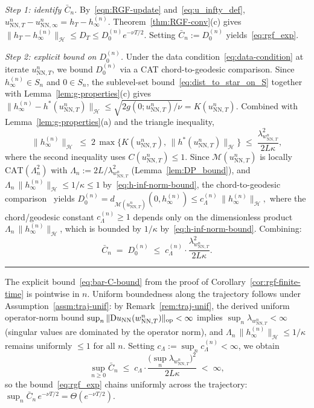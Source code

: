 \documentclass[twoside,11pt]{article}
\newcommand{\BlackBoxProof}{\rule{1.5ex}{1.5ex}}
\renewenvironment{proof}{\par\noindent{\bf Proof\ }}{\hfill\BlackBoxProof\par\medskip}
\newcommand{\D}{\mathrm{D}}
\newcommand{\NN}{\mathrm{NN}}
\newcommand{\calH}{\mathcal{H}}
\newcommand{\calM}{\mathcal{M}}
\begin{document}
\begin{proof}
\emph{Step 1: identify $\bar C_n$.}
By~\eqref{eqn:RGF-update} and~\eqref{eq:u_infty_def}, $u^n_{\NN,T}-u^n_{\NN,\infty}=h_T-h_\infty^{(n)}$. Theorem~\ref{thm:RGF-conv}(c) gives $\|h_T-h_\infty^{(n)}\|_\calH\le D_T\le D_0^{(n)} e^{-\nu T/2}$. Setting $\bar C_n:=D_0^{(n)}$ yields~\eqref{eq:rgf_exp}.

\emph{Step 2: explicit bound on $D_0^{(n)}$.}
Under the data condition~\eqref{eq:data-condition} at iterate $u^n_{\NN,T}$, we bound $D_0^{(n)}$ via a CAT chord-to-geodesic comparison. Since $h_\infty^{(n)}\in S_n$ and $0\in S_n$, the sublevel-set bound~\eqref{eq:dist_to_star_on_S} together with Lemma~\ref{lem:g-properties}(c) gives
\(
\|h_\infty^{(n)}-h^*(u^n_{\NN,T})\|_\calH \le \sqrt{2g(0;u^n_{\NN,T})/\nu} = K(u^n_{\NN,T}).
\)
Combined with Lemma~\ref{lem:g-properties}(a) and the triangle inequality,
\begin{equation}\label{eq:h-inf-norm-bound}
\|h_\infty^{(n)}\|_\calH \;\le\; 2\,\max\bigl\{K(u^n_{\NN,T}),\,\|h^*(u^n_{\NN,T})\|_\calH\bigr\} \;\le\; \frac{\lambda_{w^n_{\NN,T}}^{2}}{2L\kappa},
\end{equation}
where the second inequality uses $C(u^n_{\NN,T})\le 1$. Since $\calM(u^n_{\NN,T})$ is locally $\mathrm{CAT}(\Lambda_n^{2})$ with $\Lambda_n:=2L/\lambda_{w^n_{\NN,T}}^{2}$ (Lemma~\ref{lem:DP_bound}), and $\Lambda_n\,\|h_\infty^{(n)}\|_\calH\le 1/\kappa\le 1$ by~\eqref{eq:h-inf-norm-bound}, the chord-to-geodesic comparison~\citep[Part~II, Prop.~1.4 and Thm.~4.1]{bridson2013metric} yields
\(
D_0^{(n)} = d_{\calM(u^n_{\NN,T})}(0,h_\infty^{(n)}) \le c_\Lambda^{(n)}\,\|h_\infty^{(n)}\|_\calH,
\)
where the chord/geodesic constant $c_\Lambda^{(n)}\ge 1$ depends only on the dimensionless product $\Lambda_n\,\|h_\infty^{(n)}\|_\calH$, which is bounded by $1/\kappa$ by~\eqref{eq:h-inf-norm-bound}. Combining:
\begin{equation}\label{eq:bar-C-bound}
\bar C_n \;=\; D_0^{(n)} \;\le\; c_\Lambda^{(n)}\cdot\frac{\lambda_{w^n_{\NN,T}}^{2}}{2L\kappa}.
\end{equation}
\end{proof}

\begin{remark}\label{rem:Cbar-bound}
The explicit bound~\eqref{eq:bar-C-bound} from the proof of Corollary~\ref{cor:rgf-finite-time} is pointwise in $n$. Uniform boundedness along the trajectory follows under Assumption~\ref{assm:traj-unif}: by Remark~\ref{rem:traj-unif}, the derived uniform operator-norm bound $\sup_n\|\D u_\NN(w^n_{\NN,T})\|_{\rm op}<\infty$ implies $\sup_n\lambda_{w^n_{\NN,T}}<\infty$ (singular values are dominated by the operator norm), and $\Lambda_n\,\|h_\infty^{(n)}\|_\calH\le 1/\kappa$ remains uniformly $\le 1$ for all $n$. Setting $c_\Lambda:=\sup_n c_\Lambda^{(n)}<\infty$, we obtain
\[
\sup_{n\ge 0}\bar C_n \;\le\; c_\Lambda\cdot\frac{\bigl(\sup_n\lambda_{w^n_{\NN,T}}\bigr)^{2}}{2L\kappa} \;<\;\infty,
\]
so the bound~\eqref{eq:rgf_exp} chains uniformly across the trajectory: $\sup_n\bar C_n\,e^{-\nu T/2}=\Theta(e^{-\nu T/2})$.
\end{remark}
\end{document}
